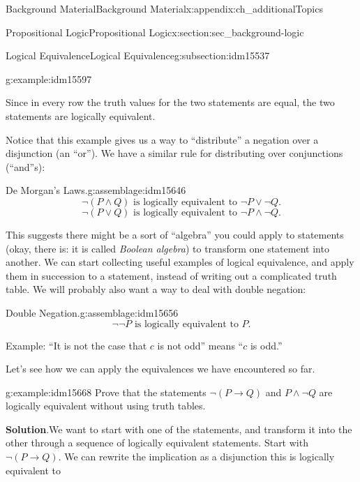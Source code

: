 \documentclass[oneside,10pt,]{book}
\numberwithin{equation}{chapter}
\def\imp{\rightarrow}
\begin{document}
\begin{appendixptx}{Background Material}{}{Background Material}{}{}{x:appendix:ch_additionalTopics}
\begin{sectionptx}{Propositional Logic}{}{Propositional Logic}{}{}{x:section:sec_background-logic}
\begin{subsectionptx}{Logical Equivalence}{}{Logical Equivalence}{}{}{g:subsection:idm15537}
\begin{example}{}{g:example:idm15597}
\begin{sidebyside}{1}{0}{0}{0}
\begin{sbspanel}{1}
{\par}
\end{sbspanel}%
\end{sidebyside}%
\par
Since in every row the truth values for the two statements are equal, the two statements are logically equivalent.%
\end{example}
Notice that this example gives us a way to ``distribute'' a negation over a disjunction (an ``or''). We have a similar rule for distributing over conjunctions (``and''s):%
\begin{assemblage}{De Morgan's Laws.}{g:assemblage:idm15646}%
%
\begin{equation*}
\neg(P \wedge Q) \text{ is logically equivalent to } \neg P \vee \neg Q.
\end{equation*}
%
\begin{equation*}
\neg(P \vee Q) \text{ is logically equivalent to } \neg P \wedge \neg Q.
\end{equation*}
%
\end{assemblage}
This suggests there might be a sort of ``algebra'' you could apply to statements (okay, there is: it is called \emph{Boolean algebra}) to transform one statement into another. We can start collecting useful examples of logical equivalence, and apply them in succession to a statement, instead of writing out a complicated truth table. We will probably also want a way to deal with double negation:%
\begin{assemblage}{Double Negation.}{g:assemblage:idm15656}%
%
\begin{equation*}
\neg \neg P \mbox{ is logically equivalent to } P.
\end{equation*}
%
\par
Example: ``It is not the case that \(c\) is not odd'' means ``\(c\) is odd.''%
\end{assemblage}
Let's see how we can apply the equivalences we have encountered so far.%
\begin{example}{}{g:example:idm15668}%
Prove that the statements \(\neg(P \imp Q)\) and \(P\wedge \neg Q\) are logically equivalent without using truth tables.%
\par\smallskip%
\noindent\textbf{Solution}.\hypertarget{g:solution:idm15673}{}\quad{}We want to start with one of the statements, and transform it into the other through a sequence of logically equivalent statements. Start with \(\neg(P \imp Q)\). We can rewrite the implication as a disjunction this is logically equivalent to%

\end{example}
\end{subsectionptx}
\end{sectionptx}
\end{appendixptx}
\end{document}
